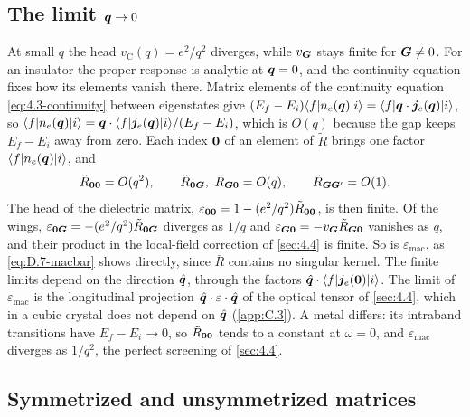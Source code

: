 \subsection*{The limit $\bm{q} \to 0$}

At small $q$ the head $v_{\mathrm{C}}(q) = e^2/q^2$ diverges, while $v_{\bm{G}}$ stays finite for $\bm{G} \neq 0$. For an insulator the proper response is analytic at $\bm{q} = 0$, and the continuity equation fixes how its elements vanish there. Matrix elements of the continuity equation \cref{eq:4.3-continuity} between eigenstates give $(E_f - E_i)\langle f|n_e(\bm{q})|i\rangle = \langle f|\bm{q}\cdot\bm{j}_e(\bm{q})|i\rangle$, so $\langle f|n_e(\bm{q})|i\rangle = \bm{q}\cdot\langle f|\bm{j}_e(\bm{q})|i\rangle/(E_f - E_i)$, which is $O(q)$ because the gap keeps $E_f - E_i$ away from zero. Each index $\bm{0}$ of an element of $\tilde R$ brings one factor $\langle f|n_e(\bm{q})|i\rangle$, and
\begin{equation*}
  \tilde R_{\bm{0}\bm{0}} = O(q^2), \qquad \tilde R_{\bm{0}\bm{G}},\ \tilde R_{\bm{G}\bm{0}} = O(q), \qquad \tilde R_{\bm{G}\bm{G}'} = O(1) .
\end{equation*}
The head of the dielectric matrix, $\varepsilon_{\bm{0}\bm{0}} = 1 - (e^2/q^2)\tilde R_{\bm{0}\bm{0}}$, is then finite. Of the wings, $\varepsilon_{\bm{0}\bm{G}} = -(e^2/q^2)\tilde R_{\bm{0}\bm{G}}$ diverges as $1/q$ and $\varepsilon_{\bm{G}\bm{0}} = -v_{\bm{G}}\tilde R_{\bm{G}\bm{0}}$ vanishes as $q$, and their product in the local-field correction of \cref{sec:4.4} is finite. So is $\varepsilon_{\mathrm{mac}}$, as \cref{eq:D.7-macbar} shows directly, since $\bar R$ contains no singular kernel. The finite limits depend on the direction $\hat{\bm{q}}$, through the factors $\hat{\bm{q}}\cdot\langle f|\bm{j}_e(\bm{0})|i\rangle$. The limit of $\varepsilon_{\mathrm{mac}}$ is the longitudinal projection $\hat{\bm{q}}\cdot\varepsilon\cdot\hat{\bm{q}}$ of the optical tensor of \cref{sec:4.4}, which in a cubic crystal does not depend on $\hat{\bm{q}}$ (\cref{app:C.3}). A metal differs: its intraband transitions have $E_f - E_i \to 0$, so $\tilde R_{\bm{0}\bm{0}}$ tends to a constant at $\omega = 0$, and $\varepsilon_{\mathrm{mac}}$ diverges as $1/q^2$, the perfect screening of \cref{sec:4.4}.

\subsection*{Symmetrized and unsymmetrized matrices}

